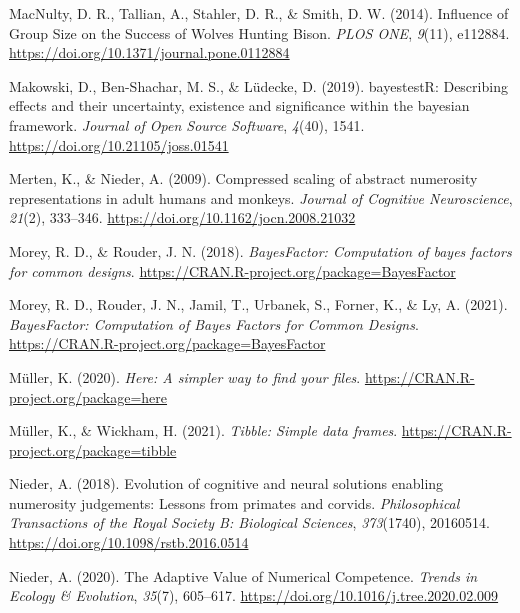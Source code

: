 \documentclass[
  ,doc,floatsintext]{apa6}
\newlength{\cslhangindent}
\newlength{\cslentryspacingunit} %
\newenvironment{CSLReferences}[2] %
 {%
  \setlength{\parindent}{0pt}
  \ifodd #1
  \let\oldpar\par
  \def\par{\hangindent=\cslhangindent\oldpar}
  \fi
  \setlength{\parskip}{#2\cslentryspacingunit}
 }%
 {}
\begin{document}
\begin{CSLReferences}{1}{0}
\leavevmode{}%
MacNulty, D. R., Tallian, A., Stahler, D. R., \& Smith, D. W. (2014). Influence of {Group} {Size} on the {Success} of {Wolves} {Hunting} {Bison}. \emph{PLOS ONE}, \emph{9}(11), e112884. \url{https://doi.org/10.1371/journal.pone.0112884}

\leavevmode{}%
Makowski, D., Ben-Shachar, M. S., \& Lüdecke, D. (2019). bayestestR: Describing effects and their uncertainty, existence and significance within the bayesian framework. \emph{Journal of Open Source Software}, \emph{4}(40), 1541. \url{https://doi.org/10.21105/joss.01541}

\leavevmode{}%
Merten, K., \& Nieder, A. (2009). Compressed scaling of abstract numerosity representations in adult humans and monkeys. \emph{Journal of Cognitive Neuroscience}, \emph{21}(2), 333--346. \url{https://doi.org/10.1162/jocn.2008.21032}

\leavevmode{}%
Morey, R. D., \& Rouder, J. N. (2018). \emph{BayesFactor: Computation of bayes factors for common designs}. \url{https://CRAN.R-project.org/package=BayesFactor}

\leavevmode{}%
Morey, R. D., Rouder, J. N., Jamil, T., Urbanek, S., Forner, K., \& Ly, A. (2021). \emph{{BayesFactor}: {Computation} of {Bayes} {Factors} for {Common} {Designs}}. \url{https://CRAN.R-project.org/package=BayesFactor}

\leavevmode{}%
Müller, K. (2020). \emph{Here: A simpler way to find your files}. \url{https://CRAN.R-project.org/package=here}

\leavevmode{}%
Müller, K., \& Wickham, H. (2021). \emph{Tibble: Simple data frames}. \url{https://CRAN.R-project.org/package=tibble}

\leavevmode{}%
Nieder, A. (2018). Evolution of cognitive and neural solutions enabling numerosity judgements: Lessons from primates and corvids. \emph{Philosophical Transactions of the Royal Society B: Biological Sciences}, \emph{373}(1740), 20160514. \url{https://doi.org/10.1098/rstb.2016.0514}

\leavevmode{}%
Nieder, A. (2020). The {Adaptive} {Value} of {Numerical} {Competence}. \emph{Trends in Ecology \& Evolution}, \emph{35}(7), 605--617. \url{https://doi.org/10.1016/j.tree.2020.02.009}


\end{CSLReferences}
\end{document}
